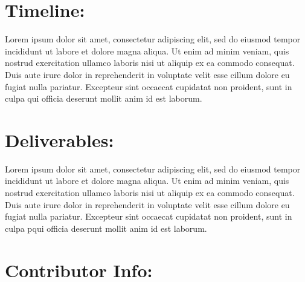 \documentclass{article}
\begin{document}
\begin{normalsize}
\begin{quote}
\end{quote}

\section{Timeline:}

Lorem ipsum dolor sit amet, consectetur adipiscing elit, sed do eiusmod tempor
incididunt ut labore et dolore magna aliqua. Ut enim ad minim veniam, quis nostrud
exercitation ullamco laboris nisi ut aliquip ex ea commodo consequat. Duis aute
irure dolor in reprehenderit in voluptate velit esse cillum dolore eu fugiat nulla
pariatur. Excepteur sint occaecat cupidatat non proident, sunt in culpa qui
officia deserunt mollit anim id est laborum.

\section{Deliverables:}

Lorem ipsum dolor sit amet, consectetur adipiscing elit, sed do eiusmod tempor
incididunt ut labore et dolore magna aliqua. Ut enim ad minim veniam, quis nostrud
exercitation ullamco laboris nisi ut aliquip ex ea commodo consequat. Duis aute
irure dolor in reprehenderit in voluptate velit esse cillum dolore eu fugiat nulla
pariatur. Excepteur sint occaecat cupidatat non proident, sunt in culpa pqui
officia deserunt mollit anim id est laborum.

\section{Contributor Info:}



\end{normalsize}
\end{document}
